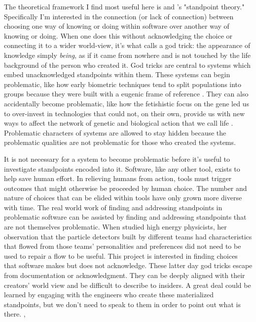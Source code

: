 \documentclass[a4paper,man,natbib,floatsintext]{apa6}
\begin{document}
   The theoretical framework I find most useful here is \citet{Harding1992-od} and \citet{Haraway1988-nh}'s "standpoint theory." Specifically I'm interested in the connection (or lack of connection) between choosing one way of knowing or doing within software over another way of knowing or doing. When one does this without acknowledging the choice or connecting it to a wider world-view, it's what \citet{Haraway1988-nh} calls a god trick: the appearance of knowledge simply \textit{being}, as if it came from nowhere and is not touched by the life background of the person who created it. God tricks are central to systems which embed unacknowledged standpoints within them. These systems can begin problematic, like how early biometric techniques tend to split populations into groups because they were built with a eugenic frame of reference \citet{Subramaniam2014-wg}. They can also accidentally become problematic, like how the fetishistic focus on the gene led us to over-invest in technologies that could not, on their own, provide us with new ways to affect the network of genetic and biological action that we call life \citet{Harraway1997-va,Reardon2017-bo}. Problematic characters of systems are allowed to stay hidden because the problematic qualities are not problematic for those who created the systems. 

   It is not necessary for a system to become problematic before it's useful to investigate standpoints encoded into it. Software, like any other tool, exists to help save human effort. In relieving humans from action, tools must trigger outcomes that might otherwise be proceeded by human choice. The number and nature of choices that can be elided within tools have only grown more diverse with time. The real world work of finding and addressing standpoints in problematic software can be assisted by finding and addressing standpoints that are not themselves problematic. When \citet{Traweek2009-uu} studied high energy physicists, her observation that the particle detectors built by different teams had characteristics that flowed from those teams' personalities and preferences did not need to be used to repair a flow to be useful. This project is interested in finding choices that software makes but does not acknowledge. These latter day god tricks escape from documentation or acknowledgment. They can be deeply aligned with their creators' world view and be difficult to describe to insiders. A great deal could be learned by engaging with the engineers who create these materialized standpoints, but we don't need to speak to them in order to point out what is there.
,
  
\end{document}
